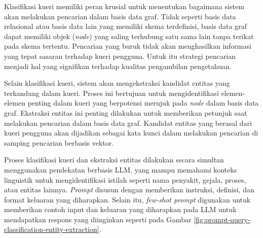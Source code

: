 Klasifikasi kueri memiliki peran krusial untuk menentukan bagaimana sistem akan melakukan pencarian dalam basis data graf.
Tidak seperti basis data relasional atau basis data lain yang memiliki skema terdefinisi, basis data graf dapat memiliki objek (\textit{node}) yang saling terhubung satu sama lain tanpa terikat pada skema tertentu.
Pencarian yang buruk tidak akan menghasilkan informasi yang tepat sasaran terhadap kueri pengguna.
Untuk itu strategi pencarian menjadi hal yang signifikan terhadap kualitas pengambilan pengetahuan.

Selain klasifikasi kueri, sistem akan mengekstraksi kandidat entitas yang terkandung dalam kueri.
Proses ini bertujuan untuk mengidentifikasi elemen-elemen penting dalam kueri yang berpotensi merujuk pada \textit{node} dalam basis data graf.
Ekstraksi entitas ini penting dilakukan untuk memberikan petunjuk saat melakukan pencarian dalam basis data graf.
Kandidat entitas yang berasal dari kueri pengguna akan dijadikan sebagai kata kunci dalam melakukan pencarian di samping pencarian berbasis vektor.

Proses klasifikasi kueri dan ekstraksi entitas dilakukan secara simultan menggunakan pendekatan berbasis LLM, yang mampu memahami konteks linguistik untuk mengidentifikasi istilah seperti nama penyakit, gejala, proses, atau entitas lainnya.
\textit{Prompt} disusun dengan memberikan instruksi, definisi, dan format keluaran yang diharapkan.
Selain itu, \textit{few-shot prompt} digunakan untuk memberikan contoh input dan keluaran yang diharapkan pada LLM untuk mendapatkan respons yang diinginkan seperti pada Gambar \ref{fig:prompt-query-classification-entity-extraction}.

